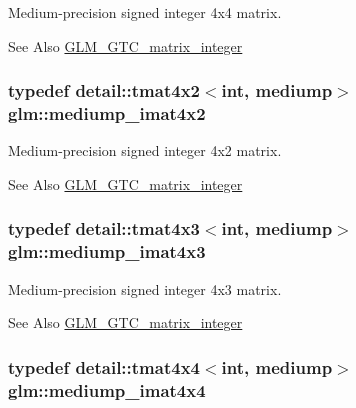 Medium-\/precision signed integer 4x4 matrix. \begin{DoxySeeAlso}{See Also}
\hyperlink{group__gtc__matrix__integer}{G\-L\-M\-\_\-\-G\-T\-C\-\_\-matrix\-\_\-integer} 
\end{DoxySeeAlso}
\hypertarget{group__gtc__matrix__integer_gacdae7d6ae4820756c62c2b5fd5c0370a}{
\subsubsection[{mediump\-\_\-imat4x2}]{\setlength{\rightskip}{0pt plus 5cm}typedef detail\-::tmat4x2$<$int, mediump$>$ {\bf glm\-::mediump\-\_\-imat4x2}}}\label{group__gtc__matrix__integer_gacdae7d6ae4820756c62c2b5fd5c0370a}
Medium-\/precision signed integer 4x2 matrix. \begin{DoxySeeAlso}{See Also}
\hyperlink{group__gtc__matrix__integer}{G\-L\-M\-\_\-\-G\-T\-C\-\_\-matrix\-\_\-integer} 
\end{DoxySeeAlso}
\hypertarget{group__gtc__matrix__integer_ga5032ee978a55aa0db4842d5c3cbeade0}{
\subsubsection[{mediump\-\_\-imat4x3}]{\setlength{\rightskip}{0pt plus 5cm}typedef detail\-::tmat4x3$<$int, mediump$>$ {\bf glm\-::mediump\-\_\-imat4x3}}}\label{group__gtc__matrix__integer_ga5032ee978a55aa0db4842d5c3cbeade0}
Medium-\/precision signed integer 4x3 matrix. \begin{DoxySeeAlso}{See Also}
\hyperlink{group__gtc__matrix__integer}{G\-L\-M\-\_\-\-G\-T\-C\-\_\-matrix\-\_\-integer} 
\end{DoxySeeAlso}
\hypertarget{group__gtc__matrix__integer_gafa2df6be3aad055867b9bfea34e9c4a0}{
\subsubsection[{mediump\-\_\-imat4x4}]{\setlength{\rightskip}{0pt plus 5cm}typedef detail\-::tmat4x4$<$int, mediump$>$ {\bf glm\-::mediump\-\_\-imat4x4}}}\label{group__gtc__matrix__integer_gafa2df6be3aad055867b9bfea34e9c4a0}
